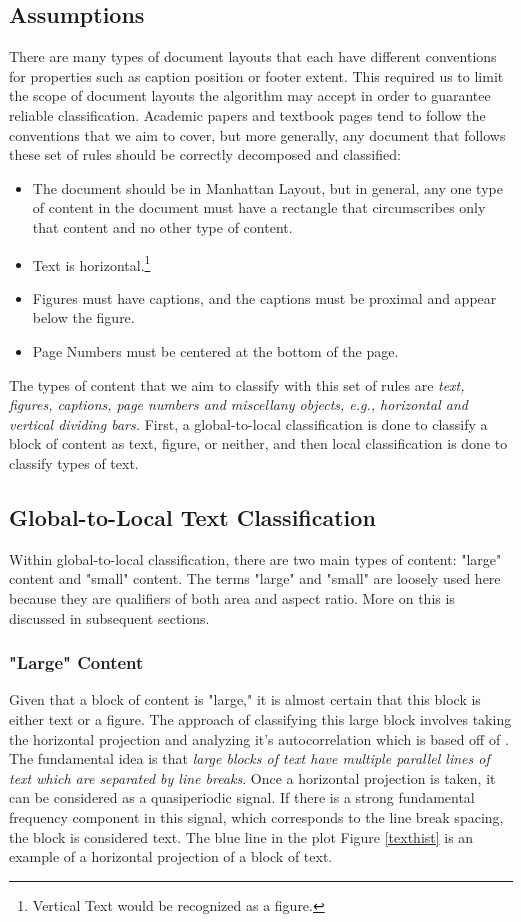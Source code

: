 \documentclass{report}
\begin{document}
\subsection{Assumptions} 
There are many types of document layouts that each have different conventions for properties such as caption position or footer extent. This required us to limit the scope of document layouts the algorithm may accept in order to guarantee reliable classification. Academic papers and textbook pages tend to follow the conventions that we aim to cover, but more generally, any document that follows these set of rules should be correctly decomposed and classified:

\begin{itemize}
\item The document should be in Manhattan Layout, but in general, any one type of content in the document must have a rectangle that circumscribes only that content and no other type of content.
\item Text is horizontal.\footnote{Vertical Text would be recognized as a figure.}
\item Figures must have captions, and the captions must be proximal and appear below the figure.
\item Page Numbers must be centered at the bottom of the page.
\end{itemize}


The types of content that we aim to classify with this set of rules are \textit{text, figures, captions, page numbers and miscellany objects, e.g., horizontal and vertical dividing bars.} First, a global-to-local classification is done to classify a block of content as text, figure, or neither, and then local classification is done to classify types of text.

\subsection{Global-to-Local Text Classification}
Within global-to-local classification, there are two main types of content: "large" content and "small" content. The terms "large" and "small" are loosely used here because they are qualifiers of both area and aspect ratio. More on this is discussed in subsequent sections.

\subsubsection{"Large" Content}
Given that a block of content is "large," it is almost certain that this block is either text or a figure. The approach of classifying this large block involves taking the horizontal projection and analyzing it's autocorrelation which is based off of \cite{BairdOrig}. The fundamental idea is that \emph{large blocks of text have multiple parallel lines of text which are separated by line breaks}. Once a horizontal projection is taken, it can be considered as a quasiperiodic signal. If there is a strong fundamental frequency component in this signal, which corresponds to the line break spacing, the block is considered text. The blue line in the plot Figure \ref{texthist} is an example of a horizontal projection of a block of text.
\end{document}
